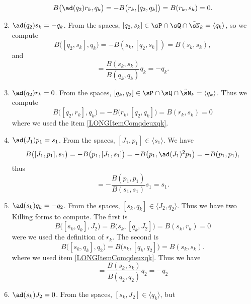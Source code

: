 \begin{enumerate}
		\begin{equation}
			B\big( \ad(q_2)r_k,q_k \big)=-B\big( r_k,[q_2,q_k] \big)=B(r_k,s_k)=0.
		\end{equation}
	\item$\ad(q_2)s_k=-q_k$. From the spaces, $[q_2,s_k]\in\sP\cap\sQ\cap\tilde\sN_k=\langle q_k\rangle$, so we compute
		\begin{equation}
			B\big( [q_2,s_k],q_k \big)=-B(s_k,[q_2,s_k])=B(s_k,s_k),
		\end{equation}
		and 
		\begin{equation}
			[q_2,s_k]=\frac{ B(s_k,s_k) }{ B(q_k,q_k) }q_k=-q_k.
		\end{equation}
	\item$\ad(q_2)r_k=0$. From the spaces, $[q_k,q_2]\in\sP\cap\sQ\cap\tilde\sN_k=\langle q_k\rangle$. Thus we compute
		\begin{equation}
			B\big( [q_2,r_k],q_k \big)=-B\big( r_k,[q_2,q_k] \big)=B(r_k,s_k)=0
		\end{equation}
		where we used the item \ref{LONGItemComqdeuxqk}.
	\item\label{LONGItemComjunpun}$\ad(J_1)p_1=s_1$. From the spaces, $[J_1,p_1]\in\langle s_1\rangle$. We have
		\begin{equation}
			B\big( [J_1,p_1],s_1 \big)=-B\big( p_1,[J_1,s_1] \big)=-B\big( p_1,\ad(J_1)^2p_1 \big)=-B(p_1,p_1),
		\end{equation}
		thus
		\begin{equation}
			[J_1,p_1]=-\frac{ B(p_1,p_1) }{ B(s_1,s_1) }s_1=s_1.
		\end{equation}
	\item\label{LONGItemComskqk}$\ad(s_k)q_k=-q_2$. From the spaces, $[s_k,q_k]\in\langle J_2,q_2\rangle$. Thus we have two Killing forms to compute. The first is
		\begin{equation}
			B\big( [s_k,q_k],J_2 \big)=B\big( s_k,[q_k,J_2] \big)=B(s_k,r_k)=0
		\end{equation}
		were we used the definition of $r_k$. The second is
		\begin{equation}
			B\big( [s_k,q_k],q_2 \big)=B\big( s_k,[q_k,q_2] \big)=B(s_k,s_k).
		\end{equation}
		where we used item \ref{LONGItemComqdeuxqk}. Thus we have
		\begin{equation}
			[s_k,q_k]=\frac{ B(s_k,s_k) }{ B(q_2,q_2) }q_2=-q_2
		\end{equation}
	\item$\ad(s_k)J_2=0$. From the spaces, $[s_k,J_2]\in\langle q_k\rangle$, but

\end{enumerate}
